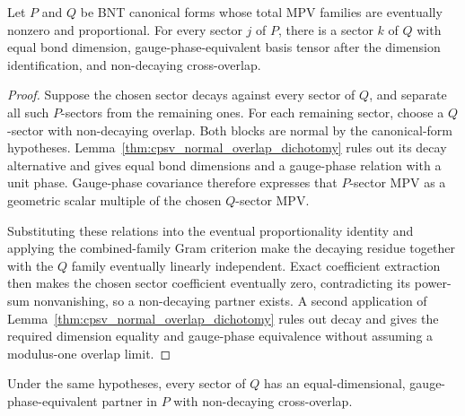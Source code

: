 \begin{lemma}
    \label{thm:sector_bnt_proportional_exact_match}
    \leanok
    Let $P$ and $Q$ be BNT canonical forms whose total MPV families are
    eventually nonzero and proportional. For every sector $j$ of $P$, there is
    a sector $k$ of $Q$ with equal bond dimension, gauge-phase-equivalent basis
    tensor after the dimension identification, and non-decaying cross-overlap.
\end{lemma}

\begin{proof}\leanok
    Suppose the chosen sector decays against every sector of $Q$, and separate
    all such $P$-sectors from the remaining ones. For each remaining sector,
    choose a $Q$-sector with non-decaying overlap. Both blocks are normal by the
    canonical-form hypotheses. Lemma~\ref{thm:cpsv_normal_overlap_dichotomy}
    rules out its decay alternative and gives equal bond dimensions and a
    gauge-phase relation with a unit phase. Gauge-phase covariance therefore
    expresses that $P$-sector MPV as a geometric scalar multiple of the chosen
    $Q$-sector MPV.

    Substituting these relations into the eventual proportionality identity and
    applying the combined-family Gram criterion make the decaying residue
    together with the $Q$ family eventually linearly independent. Exact
    coefficient extraction then makes the chosen sector coefficient eventually
    zero, contradicting its power-sum nonvanishing, so a non-decaying partner
    exists. A second application of
    Lemma~\ref{thm:cpsv_normal_overlap_dichotomy} rules out decay and gives
    the required dimension equality and gauge-phase equivalence without assuming
    a modulus-one overlap limit.
\end{proof}

\begin{lemma}
    \label{thm:sector_bnt_proportional_full_basis_match}
    \leanok
    Under the same hypotheses, every sector of $Q$ has an equal-dimensional,
    gauge-phase-equivalent partner in $P$ with non-decaying cross-overlap.
\end{lemma}


